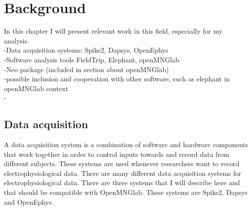\chapter{Background}
In this chapter I will present relevant work in this field, especially for my analysis.\\
-Data acquisition systems: Spike2, Dapsys, OpenEphys\\
-Software analysis tools FieldTrip, Elephant, openMNGlab\\
-Neo package (included in section about openMNGlab)\\
-possible inclusion and cooperation with other software, such as elephant in openMNGlab context\\


-%



\section{Data acquisition} 
A data acquisition system is a combination of software and hardware components that work together in order to control inputs towards and record data from different subjects. These systems are used whenever researchers want to record electrophysiological data.
There are many different data acquisition systems for electrophysiological data. There are three systems that I will describe here and that should be compatible with OpenMNGlab. These systems are Spike2, Dapsys and OpenEphys.

